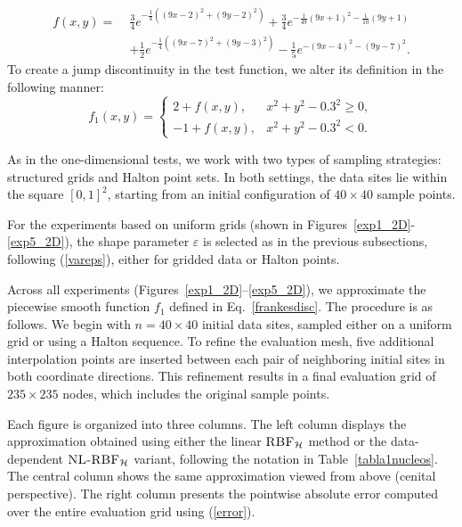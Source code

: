 \documentclass[preprint]{elsarticle}       %
\begin{document}
\begin{equation}\label{frankesfunction}
\begin{split}
f(x,y) =\;& \frac{3}{4} e^{- \frac{1}{4}((9x - 2)^2 + (9y - 2)^2)} + \frac{3}{4} e^{- \frac{1}{49}(9x + 1)^2 - \frac{1}{10}(9y + 1)} \\
& + \frac{1}{2} e^{- \frac{1}{4}((9x - 7)^2 + (9y - 3)^2)} - \frac{1}{5} e^{-(9x - 4)^2 - (9y - 7)^2}.
\end{split}
\end{equation}
To create a jump discontinuity in the test function, we alter its definition in the following manner:
\begin{equation}\label{frankesdisc}
f_1(x,y) = \left\{
\begin{array}{ll}
2 + f(x,y), & x^2 + y^2 - 0.3^2 \geq 0, \\
-1 + f(x,y), & x^2 + y^2 - 0.3^2 < 0.
\end{array}
\right.
\end{equation}

As in the one-dimensional tests, we work with two types of sampling strategies: structured grids and Halton point sets. In both settings, the data sites lie within the square \([0,1]^2\), starting from an initial configuration of \(40 \times 40\) sample points.

For the experiments based on uniform grids (shown in Figures~\ref{exp1_2D}-\ref{exp5_2D}), the shape parameter \(\varepsilon\) is selected as in the previous subsections, following (\ref{vareps}), either for gridded data or Halton points.

Across all experiments (Figures~\ref{exp1_2D}--\ref{exp5_2D}), we approximate the piecewise smooth function \(f_1\) defined in Eq.~\eqref{frankesdisc}. The procedure is as follows. We begin with \(n = 40 \times 40\) initial data sites, sampled either on a uniform grid or using a Halton sequence. To refine the evaluation mesh, five additional interpolation points are inserted between each pair of neighboring initial sites in both coordinate directions. This refinement results in a final evaluation grid of \(235 \times 235\) nodes, which includes the original sample points.

Each figure is organized into three columns. The left column displays the approximation obtained using either the linear \(\textsc{RBF}_{\mathcal{H}}\) method or the data-dependent \(\textsc{NL-RBF}_{\mathcal{H}}\) variant, following the notation in Table~\ref{tabla1nucleos}. The central column shows the same approximation viewed from above (cenital perspective). The right column presents the pointwise absolute error computed over the entire evaluation grid using (\ref{error}).
\end{document}
